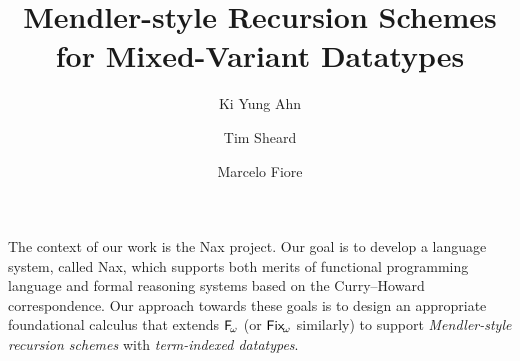 \documentclass[a4paper]{easychair} %
\title{Mendler-style Recursion Schemes for Mixed-Variant Datatypes}
\author{
Ki Yung Ahn\inst{1}
\and
Tim Sheard\inst{1}
 \and
Marcelo Fiore\inst{2}
}
\institute{
  Portland State University~\thanks{supported by NSF grant 0910500.}
\and
  University of Cambridge
}
\newcommand{\Fw}[0]{{\ensuremath{\mathsf{\uppercase{F}}_{\!\omega}}}}
\newcommand{\Fixw}[0]{{\ensuremath{\mathsf{\uppercase{F}\lowercase{ix}}_{\!\omega}}}}
\begin{document}
\maketitle


The context of our work is the Nax project.
Our goal is to develop a language system, called Nax, which supports both merits of
functional programming language and formal reasoning systems based on
the Curry--Howard correspondence. Our approach towards these goals is to 
design an appropriate foundational calculus \cite{AhnSheFioPit13}
that extends \Fw \cite{Girard72} (or \Fixw \cite{AbeMat04} similarly) to support
\emph{Mendler-style recursion schemes} \cite{Mendler87} with \emph{term-indexed datatypes}.
\end{document}
